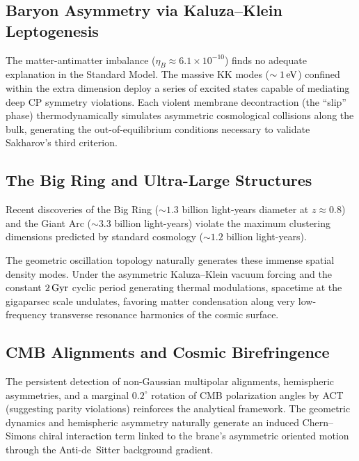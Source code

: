 \subsection{Baryon Asymmetry via Kaluza--Klein Leptogenesis}
\label{sec:baryogenesis}

The matter-antimatter imbalance ($\eta_B \approx 6.1 \times 10^{-10}$) finds no adequate explanation in the Standard Model. The massive KK modes ($\sim 1\,\text{eV}$) confined within the extra dimension deploy a series of excited states capable of mediating deep CP symmetry violations. Each violent membrane decontraction (the ``slip'' phase) thermodynamically simulates asymmetric cosmological collisions along the bulk, generating the out-of-equilibrium conditions necessary to validate Sakharov's third criterion.

\subsection{The Big Ring and Ultra-Large Structures}
\label{sec:big_ring}

Recent discoveries of the Big Ring ($\sim 1.3$ billion light-years diameter at $z \approx 0.8$) and the Giant Arc ($\sim 3.3$ billion light-years) violate the maximum clustering dimensions predicted by standard cosmology ($\sim 1.2$ billion light-years).

The geometric oscillation topology naturally generates these immense spatial density modes. Under the asymmetric Kaluza--Klein vacuum forcing and the constant $2\,\text{Gyr}$ cyclic period generating thermal modulations, spacetime at the gigaparsec scale undulates, favoring matter condensation along very low-frequency transverse resonance harmonics of the cosmic surface.

\subsection{CMB Alignments and Cosmic Birefringence}
\label{sec:cmb_birefringence}

The persistent detection of non-Gaussian multipolar alignments, hemispheric asymmetries, and a marginal $0.2^\circ$ rotation of CMB polarization angles by ACT (suggesting parity violations) reinforces the analytical framework. The geometric dynamics and hemispheric asymmetry naturally generate an induced Chern--Simons chiral interaction term linked to the brane's asymmetric oriented motion through the Anti-de~Sitter background gradient.

